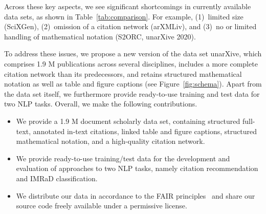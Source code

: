 Across these key aspects, we see significant shortcomings in currently available data sets, as shown in Table~\ref{tab:comparison}. For example, (1)~limited size (SciXGen), (2)~omission of a citation network (arXMLiv), and (3)~no or limited handling of mathematical notation (S2ORC, unarXive 2020).

%
%
%
%


To address these issues, we propose a new version of the data set unarXive, %
which comprises 1.9 M publications across several disciplines, includes a more complete citation network than its predecessors, and retains structured mathematical notation as well as table and figure captions (see Figure~\ref{fig:schema}).  %
Apart from the data set itself, we furthermore provide ready-to-use training and test data for two NLP tasks. Overall, we make the following contributions.


\begin{itemize}
    \item We provide a 1.9 M document scholarly data set, containing structured full-text, annotated in-text citations, linked table and figure captions, structured mathematical notation, and a high-quality citation network.
    \item We provide ready-to-use training/test data for the development and evaluation of approaches to two NLP tasks, namely citation recommendation and IMRaD classification.
    \item We distribute our data in accordance to the FAIR principles~\cite{Wilkinson2016} and share our source code freely available under a permissive license.
\end{itemize}

